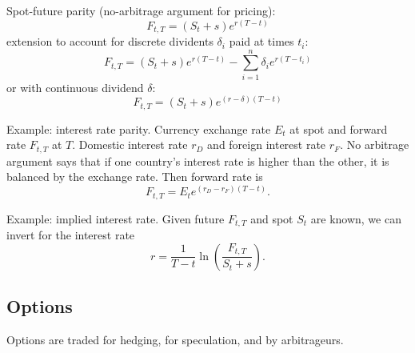 \documentclass[9pt,twocolumn]{extarticle}
\begin{document}
Spot-future parity (no-arbitrage argument for pricing):
$$ F_{t,T} = (S_t + s) e^{r(T-t)} $$
extension to account for discrete dividents $\delta_i$ paid at times $t_i$:
$$ F_{t,T} = (S_t + s) e^{r(T-t)} - \sum_{i=1}^n \delta_i e^{r(T-t_i)} $$
or with continuous dividend $\delta$:
$$ F_{t,T} = (S_t + s) e^{(r-\delta)(T-t)} $$

Example: interest rate parity. Currency exchange rate $E_t$ at spot and forward
rate $F_{t,T}$ at $T$. Domestic interest rate $r_D$ and foreign interest
rate $r_F$. No arbitrage argument says that if one country's interest rate is
higher than the other, it is balanced by the exchange rate. Then forward rate
is $$F_{t,T} = E_t e^{(r_D - r_F) (T-t)}.$$

Example: implied interest rate. Given future $F_{t,T}$ and spot $S_t$ are known,
we can invert for the interest rate $$r = \frac{1}{T-t} \ln\left(\frac{F_{t,T}}{S_t+s}\right).$$

\subsection*{Options}

Options are traded for hedging, for speculation, and by arbitrageurs.
\end{document}
